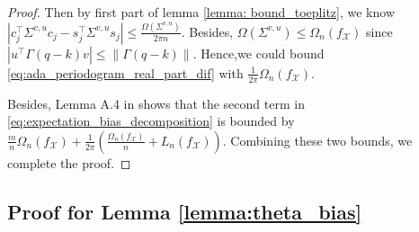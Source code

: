 \begin{proof}
Then by first part of lemma \ref{lemma: bound_toeplitz}, we know $\left|c_j^\top  \Sigma^{v,u}c_j-s_j^\top  \Sigma^{v,u}s_j\right|\le \frac{\Omega(\Sigma^{v,u})}{2\pi n}$. Besides, $\Omega(\Sigma^{v,u}) \le \Omega_n(f_\mathcal{X})$ since  $\left|u^\top  \Gamma(q-k)v\right| \le \|\Gamma(q-k) \| $. Hence,we could bound \eqref{eq:ada_periodogram_real_part_dif} with $\frac{1}{2\pi} \Omega_n(f_\mathcal{X})$. \par 
Besides, Lemma A.4 in \cite{sun2018large} shows that the second term in \eqref{eq:expectation_bias_decomposition} is bounded by $\frac{m}{n}\Omega_n(f_\mathcal{X}) + \frac{1}{2\pi}\left(\frac{\Omega_n(f_\mathcal{X})}{n}+L_n(f_\mathcal{X})\right)$. Combining these two bounds, we complete the proof. 
 \end{proof}
 
\subsection{Proof for Lemma \ref{lemma:theta_bias}} 
